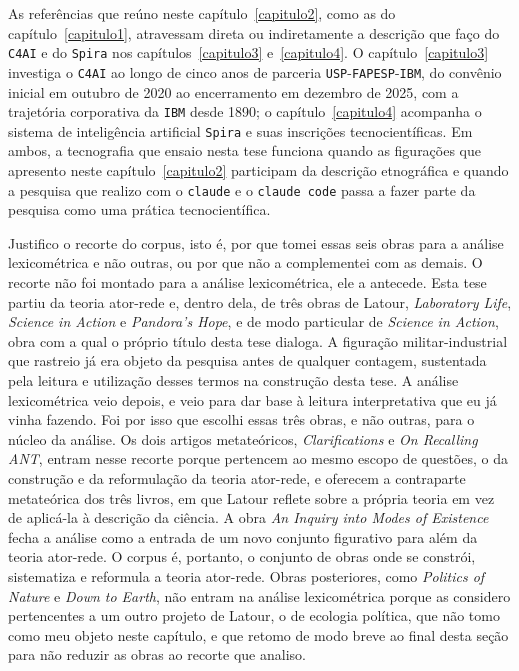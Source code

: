 As referências que reúno neste capítulo~\ref{capitulo2}, como as do capítulo~\ref{capitulo1}, atravessam direta ou indiretamente a descrição que faço do \texttt{C4AI} e do \texttt{Spira} nos capítulos~\ref{capitulo3} e~\ref{capitulo4}. O capítulo~\ref{capitulo3} investiga o \texttt{C4AI} ao longo de cinco anos de parceria \texttt{USP}-\texttt{FAPESP}-\texttt{IBM}, do convênio inicial em outubro de 2020 ao encerramento em dezembro de 2025, com a trajetória corporativa da \texttt{IBM} desde 1890; o capítulo~\ref{capitulo4} acompanha o sistema de inteligência artificial \texttt{Spira} e suas inscrições tecnocientíficas. Em ambos, a tecnografia que ensaio nesta tese funciona quando as figurações que apresento neste capítulo~\ref{capitulo2} participam da descrição etnográfica e quando a pesquisa que realizo com o \texttt{claude} e o \texttt{claude code} passa a fazer parte da pesquisa como uma prática tecnocientífica.

Justifico o recorte do corpus, isto é, por que tomei essas seis obras para a análise lexicométrica e não outras, ou por que não a complementei com as demais. O recorte não foi montado para a análise lexicométrica, ele a antecede. Esta tese partiu da teoria ator-rede e, dentro dela, de três obras de Latour, \emph{Laboratory Life}, \emph{Science in Action} e \emph{Pandora's Hope}, e de modo particular de \emph{Science in Action}, obra com a qual o próprio título desta tese dialoga. A figuração militar-industrial que rastreio já era objeto da pesquisa antes de qualquer contagem, sustentada pela leitura e utilização desses termos na construção desta tese. A análise lexicométrica veio depois, e veio para dar base à leitura interpretativa que eu já vinha fazendo. Foi por isso que escolhi essas três obras, e não outras, para o núcleo da análise. Os dois artigos metateóricos, \emph{Clarifications} e \emph{On Recalling ANT}, entram nesse recorte porque pertencem ao mesmo escopo de questões, o da construção e da reformulação da teoria ator-rede, e oferecem a contraparte metateórica dos três livros, em que Latour reflete sobre a própria teoria em vez de aplicá-la à descrição da ciência. A obra \emph{An Inquiry into Modes of Existence} fecha a análise como a entrada de um novo conjunto figurativo para além da teoria ator-rede. O corpus é, portanto, o conjunto de obras onde se constrói, sistematiza e reformula a teoria ator-rede. Obras posteriores, como \emph{Politics of Nature} e \emph{Down to Earth}, não entram na análise lexicométrica porque as considero pertencentes a um outro projeto de Latour, o de ecologia política, que não tomo como meu objeto neste capítulo, e que retomo de modo breve ao final desta seção para não reduzir as obras ao recorte que analiso. 

